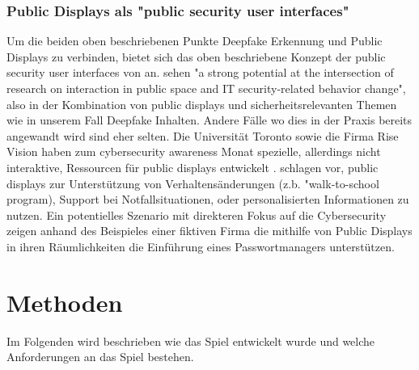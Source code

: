 \subsection{Public Displays als "public security user interfaces"}
Um die beiden oben beschriebenen Punkte Deepfake Erkennung und Public Displays zu verbinden, 
bietet sich das oben beschriebene Konzept der public security user interfaces von an. 
\textcite{murtezajPublicSecurityUser2025} sehen "a strong potential at the intersection of research on interaction in public space and IT security-related behavior change", 
also in der Kombination von public displays und sicherheitsrelevanten Themen wie in unserem Fall Deepfake Inhalten. 
Andere Fälle wo dies in der Praxis bereits angewandt wird sind eher selten. Die Universität Toronto sowie die Firma Rise Vision haben zum cybersecurity awareness Monat spezielle, 
allerdings nicht interaktive, Ressourcen für public displays entwickelt \cite{visionCyberSecurityAwareness,CyberSecurityAwareness}. 
\textcite{daviesOpenDisplayNetworks2012} schlagen vor, public displays zur Unterstützung von Verhaltensänderungen (z.b. "walk-to-school program), 
Support bei Notfallsituationen, oder personalisierten Informationen zu nutzen. 
Ein potentielles Szenario mit direkteren Fokus auf die Cybersecurity zeigen \textcite{murtezajPublicSecurityUser2025} anhand des Beispieles einer fiktiven Firma die mithilfe 
von Public Displays in ihren Räumlichkeiten die Einführung eines Passwortmanagers unterstützen. 

\chapter{Methoden}
Im Folgenden wird beschrieben wie das Spiel entwickelt wurde und welche Anforderungen an das Spiel bestehen.
